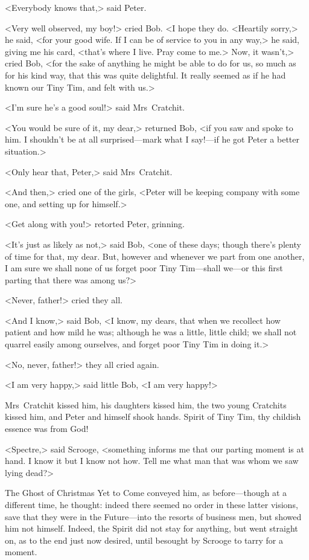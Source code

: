 <Everybody knows that,> said Peter.

<Very well observed, my boy!> cried Bob. <I hope they do. <Heartily sorry,> he said, <for your good wife. If I can be of service to you in any way,> he said, giving me his card, <that's where I live. Pray come to me.> Now, it wasn't,> cried Bob, <for the sake of anything he might be able to do for us, so much as for his kind way, that this was quite delightful. It really seemed as if he had known our Tiny Tim, and felt with us.>

<I'm sure he's a good soul!> said Mrs~Cratchit.

<You would be sure of it, my dear,> returned Bob, <if you saw and spoke to him. I shouldn't be at all surprised—mark what I say!—if he got Peter a better situation.>

<Only hear that, Peter,> said Mrs~Cratchit.

<And then,> cried one of the girls, <Peter will be keeping company with some one, and setting up for himself.>

<Get along with you!> retorted Peter, grinning.

<It's just as likely as not,> said Bob, <one of these days; though there's plenty of time for that, my dear. But, however and when\-ever we part from one another, I am sure we shall none of us forget poor Tiny Tim—shall we—or this first parting that there was among us?>

<Never, father!> cried they all.

<And I know,> said Bob, <I know, my dears, that when we recollect how patient and how mild he was; although he was a little, little child; we shall not quarrel easily among ourselves, and forget poor Tiny Tim in doing it.>

<No, never, father!> they all cried again.

<I am very happy,> said little Bob, <I am very happy!>

Mrs~Cratchit kissed him, his daughters kissed him, the two young Cratchits kissed him, and Peter and himself shook hands. Spirit of Tiny Tim, thy childish essence was from God!

<Spectre,> said Scrooge, <something informs me that our parting moment is at hand. I know it but I know not how. Tell me what man that was whom we saw lying dead?>

The Ghost of Christmas Yet to Come conveyed him, as before—though at a different time, he thought: indeed there seemed no order in these latter visions, save that they were in the Future—into the resorts of business men, but showed him not himself. Indeed, the Spirit did not stay for anything, but went straight on, as to the end just now desired, until besought by Scrooge to tarry for a moment.

